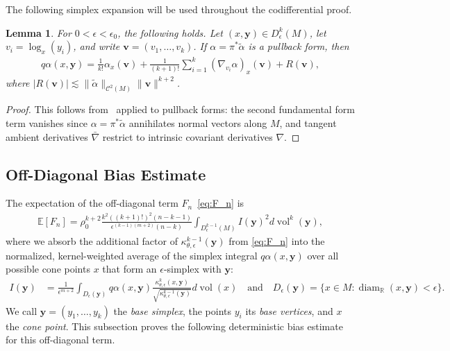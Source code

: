 \documentclass[11pt,reqno]{amsproc}
\numberwithin{equation}{section}
\newcommand{\R}{\mathbb{R}}
\newcommand{\E}{\mathbb{E}}
\newcommand{\by}{\mathbf{y}}
\newcommand{\bv}{\mathbf{v}}
\newcommand{\cC}{\mathcal{C}}
\newcommand{\talpha}{\tilde{\alpha}}
\newcommand{\ls}{\lesssim}
\newcommand{\vol}{\operatorname{vol}}
\newcommand{\diam}{\operatorname{diam}}
\newcommand{\dvol}{d\!\vol}
\newtheorem{lemma}[counter]{Lemma}
\newcommand{\andd}{\quad \text{and} \quad}
\theoremstyle{definition}
\theoremstyle{plain}
\begin{document}
The following simplex expansion will be used throughout the codifferential proof.

\begin{lemma} \label{lem:codiff_expansion}
For $0<\epsilon<\epsilon_0$, the following holds. Let $(x,\by)\in D^k_\epsilon(M)$, let $v_i=\log_x(y_i)$, and write $\bv=(v_1,\ldots,v_k)$. If $\alpha=\pi^*\talpha$ is a pullback form, then
\begin{align}
    q\alpha(x,\by) = \frac{1}{k!}\alpha_x(\bv) + \frac{1}{(k+1)!} \sum_{i=1}^k (\nabla_{v_i} \alpha)_x(\bv) + R(\bv),
\end{align}
where $|R(\bv)| \ls \|\talpha\|_{\cC^2(M)}\|\bv\|^{k+2}$.
\end{lemma}
\begin{proof}
    This follows from~ applied to pullback forms: the second fundamental form term vanishes since $\alpha=\pi^*\talpha$ annihilates normal vectors along $M$, and tangent ambient derivatives $\bar\nabla$ restrict to intrinsic covariant derivatives $\nabla$.
\end{proof}

\subsection{Off-Diagonal Bias Estimate} \label{ssec:off_diagonal}
The expectation of the off-diagonal term $F_n$~\eqref{eq:F_n} is 
\begin{align} \label{eq:EF_n}
    \E[F_n] = \rho_0^{k+2}  \frac{k^2((k+1)!)^2(n-k-1)}{\epsilon^{(k-1)(m+2)}(n-k)} \int_{D^{k-1}_\epsilon(M)} I(\by)^2 \dvol^k(\by),
\end{align}
where we absorb the additional factor of $\kappa_{\theta,\epsilon}^{k-1}(\by)$ from \eqref{eq:F_n} into the normalized, kernel-weighted average of the simplex integral $q\alpha(x,\by)$ over all possible cone points $x$ that form an $\epsilon$-simplex with $\by$:
\begin{align} \label{eq:original_I_by}
    I(\by)
    &= \frac{1}{\epsilon^{m+2}}
    \int_{D_\epsilon(\by)} q\alpha(x,\by) \frac{\kappa_{\theta,\epsilon}^k(x,\by)}{\sqrt{\kappa_{\theta,\epsilon}^{k-1}(\by)}} \dvol(x) \andd D_\epsilon(\by) = \{ x \in M : \diam_\R(x, \by) < \epsilon\}.
\end{align}
We call $\by=(y_1,\ldots,y_k)$ the \emph{base simplex}, the points $y_i$ its \emph{base vertices}, and $x$ the \emph{cone point}. This subsection proves the following deterministic bias estimate for this off-diagonal term.
\end{document}

